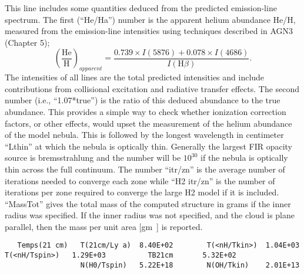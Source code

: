 This line includes some quantities deduced from the predicted emission-line
spectrum.
The first (``He/Ha'') number is the apparent helium abundance He/H,
measured from the emission-line intensities using techniques described in
AGN3 (Chapter 5);
\begin{equation}
{\left( {\frac{{{\mathrm{He}}}}{{\mathrm{H}}}} \right)_{apparent}} = \frac{{0.739
\times I(5876) + 0.078 \times I(4686)}}{{I({\mathrm{H}}\beta )}}.%
\end{equation}
The intensities of all lines are the total predicted intensities and include
contributions from collisional excitation and radiative transfer effects.
The second number (i.e., ``1.07*true'') is the ratio
of this deduced abundance
to the true abundance.
This provides a simple way to check whether
ionization correction factors, or other effects,
would upset the measurement
of the helium abundance of the model nebula.
This is followed by the longest
wavelength in centimeter ``Lthin'' at which the nebula is optically thin.
Generally the largest FIR opacity source is bremsstrahlung and the number
will be $10^{30}$ if the nebula is optically thin across the full continuum.
The number ``itr/zn'' is the average number of iterations needed to converge
each zone while ``H2 itr/zn'' is the number of iterations per zone required
to converge the large H2 model if it is included.
``MassTot'' gives the
total mass of the computed structure in grams if the inner radius
was specified.
If the inner radius was not specified, and the cloud is plane parallel,
then the mass per unit area [gm~\pscm] is reported.

{\setverbatimfontsize{\tiny}
\begin{verbatim}
   Temps(21 cm)   T(21cm/Ly a)  8.40E+02        T(<nH/Tkin>)  1.04E+03          T(<nH/Tspin>)   1.29E+03          TB21cm       5.32E+02
                  N(H0/Tspin)   5.22E+18        N(OH/Tkin)    2.01E+13
\end{verbatim}
}

